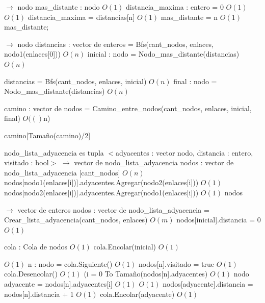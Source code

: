 \documentclass[a4paper, 10pt, twoside]{article}
\newenvironment{pseudo}[1][]{%
    \vspace{0.5em}%
    \begin{algorithmic}%
}
{%
    \end{algorithmic}%
    \vspace{0.5em}%
}
\newcommand{\Ode}[1]{\hfill $O(#1)$}
\begin{document}
\begin{pseudo}
 $\rightarrow$ nodo
  \State mas\_distante : nodo                         \Ode{1}
  \State distancia\_maxima : entero = 0                   \Ode{1}
                    \Ode{1}
      \State distancia\_maxima = distancias[n]                \Ode{1}
      \State mas\_distante = n                        \Ode{1}
    \EndIf
  \EndFor
  \Return mas\_distante;
\EndProcedure

 $\rightarrow$ nodo
  \State distancias : vector de enteros = Bfs(cant\_nodos, enlaces, nodo1(enlaces[0])) \Ode{n}
  \State inicial : nodo = Nodo\_mas\_distante(distancias)           \Ode{n}

  \State distancias = Bfs(cant\_nodos, enlaces, inicial)            \Ode{n}
  \State final : nodo = Nodo\_mas\_distante(distancias)           \Ode{n}

  \State camino : vector de nodos = Camino\_entre\_nodos(cant\_nodos, enlaces, inicial, final) \Ode(n)
  
  \Return camino[Tamaño(camino)/2]
\EndProcedure

nodo\_lista\_adyacencia es tupla $<$adyacentes : vector nodo, distancia : entero, visitado : bool$>$
 $\rightarrow$ vector de nodo\_lista\_adyacencia
  \State nodos : vector de nodo\_lista\_adyacencia [cant\_nodos]        \Ode{n}
    \State nodos[nodo1(enlaces[i])].adyacentes.Agregar(nodo2(enlaces[i])) \Ode{1}
    \State nodos[nodo2(enlaces[i])].adyacentes.Agregar(nodo1(enlaces[i])) \Ode{1}
   \EndFor
  \Return nodos
\EndProcedure

 $\rightarrow$ vector de enteros
  \State nodos : vector de nodo\_lista\_adyacencia = Crear\_lista\_adyacencia(cant\_nodos, enlaces) \Ode{m}
  \State nodos[inicial].distancia = 0                     \Ode{1}

  \State cola : Cola de nodos                         \Ode{1}
  \State cola.Encolar(inicial)                        \Ode{1}
  
                             \Ode{1}
    \State n : nodo = cola.Siguiente()                    \Ode{1}
    \State nodos[n].visitado = true                     \Ode{1}
    \State cola.Desencolar()                        \Ode{1}
    \For({i = 0 To Tamaño(nodos[n].adyacentes)}               \Ode{1}
      \State nodo adyacente = nodos[n].adyacentes[i]            \Ode{1}
                      \Ode{1}
        \State nodos[adyacente].distancia = nodos[n].distancia + 1    \Ode{1}
        \State cola.Encolar(adyacente)                  \Ode{1}
      \EndIf
    \EndFor
  \EndWhile


\end{pseudo}
\end{document}
